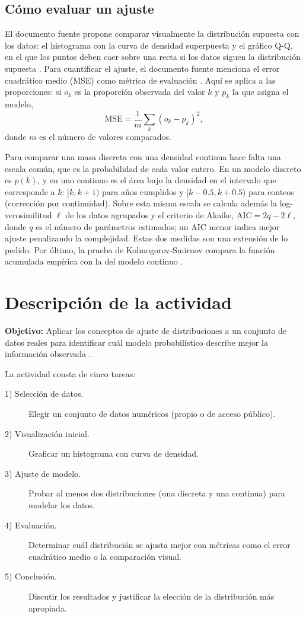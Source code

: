 \documentclass[11pt,letterpaper]{article}
\begin{document}
\subsection{Cómo evaluar un ajuste}

El documento fuente propone comparar visualmente la distribución supuesta con los datos: el histograma con la curva de densidad superpuesta y el gráfico Q-Q, en el que los puntos deben caer sobre una recta si los datos siguen la distribución supuesta \parencite{tecnm2026_documento_fuente,bruce2020}. Para cuantificar el ajuste, el documento fuente menciona el error cuadrático medio (MSE) como métrica de evaluación \parencite{tecnm2026_documento_fuente}. Aquí se aplica a las proporciones: si $o_k$ es la proporción observada del valor $k$ y $p_k$ la que asigna el modelo,
\begin{equation}
\mathrm{MSE} = \frac{1}{m}\sum_{k}(o_k - p_k)^2 ,
\end{equation}
donde $m$ es el número de valores comparados.

Para comparar una masa discreta con una densidad continua hace falta una escala común, que es la probabilidad de cada valor entero. En un modelo discreto es $p(k)$, y en uno continuo es el área bajo la densidad en el intervalo que corresponde a $k$: $[k, k+1)$ para años cumplidos y $[k - 0.5, k + 0.5)$ para conteos (corrección por continuidad). Sobre esta misma escala se calcula además la log-verosimilitud $\ell$ de los datos agrupados y el criterio de Akaike, $\mathrm{AIC} = 2q - 2\ell$, donde $q$ es el número de parámetros estimados; un AIC menor indica mejor ajuste penalizando la complejidad. Estas dos medidas son una extensión de lo pedido. Por último, la prueba de Kolmogorov-Smirnov compara la función acumulada empírica con la del modelo continuo \parencite{tecnm2026_documento_fuente}.

\section{Descripción de la actividad}

\textbf{Objetivo:} Aplicar los conceptos de ajuste de distribuciones a un conjunto de datos reales para identificar cuál modelo probabilístico describe mejor la información observada \parencite{tecnm2026_documento_fuente}.

La actividad consta de cinco tareas:

\begin{description}
    \item[1) Selección de datos.] Elegir un conjunto de datos numéricos (propio o de acceso público).
    \item[2) Visualización inicial.] Graficar un histograma con curva de densidad.
    \item[3) Ajuste de modelo.] Probar al menos dos distribuciones (una discreta y una continua) para modelar los datos.
    \item[4) Evaluación.] Determinar cuál distribución se ajusta mejor con métricas como el error cuadrático medio o la comparación visual.
    \item[5) Conclusión.] Discutir los resultados y justificar la elección de la distribución más apropiada.
\end{description}
\end{document}

